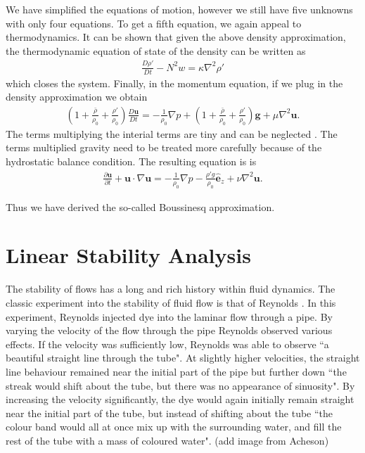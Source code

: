 We have simplified the equations of motion, however we still have five unknowns with only four equations. To get a fifth equation, we again appeal to thermodynamics. It can be shown that given the above density approximation, the thermodynamic equation of state of the density \cite{vallis} can be written as
\begin{align}
\frac{D\rho'}{Dt} - N^{2}w = \kappa \nabla^{2} \rho'
\end{align}
which closes the system. Finally, in the momentum equation, if we plug in the density approximation we obtain
\begin{align} 
\left(1 + \frac{\bar{\rho}}{\rho_{0}} + \frac{\rho'}{\rho_{0}}\right)\frac{D\bm{u}}{Dt} = -\frac{1}{\rho_{0}}\nabla p + \left(1 + \frac{\bar{\rho}}{\rho_{0}} + \frac{\rho'}{\rho_{0}}\right)\textbf{g} + \mu \nabla^{2}\bm{u}.
\end{align}
The terms multiplying the interial terms are tiny and can be neglected \cite{kundu}. The terms multiplied gravity need to be treated more carefully because of the hydrostatic balance condition. The resulting equation is \cite{kundu,vallis} is
\begin{align} 
\frac{\partial \bm{u}}{\partial t} + \bm{u}\cdot \nabla \bm{u} = -\frac{1}{\rho_{0}}\nabla p - \frac{\rho' g}{\rho_{0}}\hat{\bm{e}}_{z} + \nu \nabla^{2}\bm{u}.
\end{align}

Thus we have derived the so-called Boussinesq approximation. 

\section{Linear Stability Analysis}
The stability of flows has a long and rich history within fluid dynamics. The classic experiment into the stability of fluid flow is that of  Reynolds \cite{reynolds1883}. In this experiment, Reynolds injected dye into the laminar flow through a pipe. By varying the velocity of the flow through the pipe Reynolds observed various effects. If the velocity was sufficiently low, Reynolds was able to observe ``a beautiful straight line through the tube". At slightly higher velocities, the straight line behaviour remained near the initial part of the pipe but further down ``the streak would shift about the tube, but there was no appearance of sinuosity". By increasing the velocity significantly, the dye would again initially remain straight near the initial part of the tube, but instead of shifting about the tube ``the colour band would all at once mix up with the surrounding water, and fill the rest of the tube with a mass of coloured water". (add image from Acheson)

